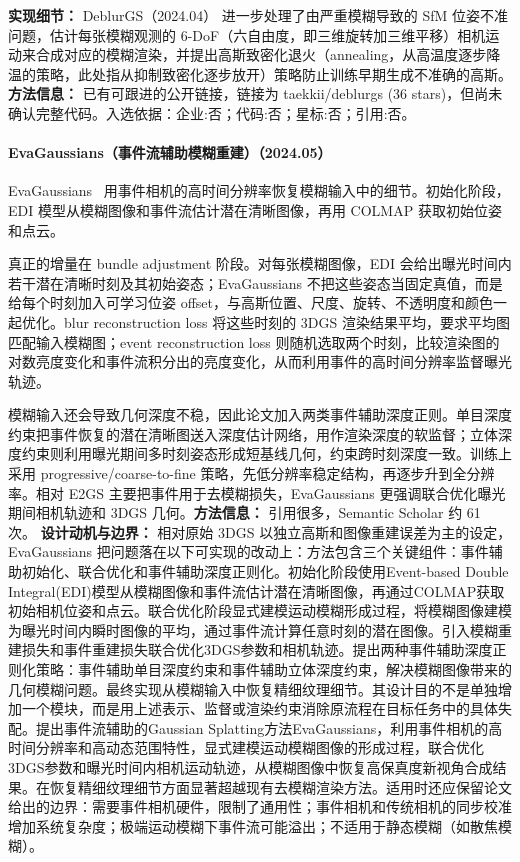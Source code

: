 \textbf{实现细节：} DeblurGS（2024.04） 进一步处理了由严重模糊导致的 SfM 位姿不准问题，估计每张模糊观测的 6-DoF（六自由度，即三维旋转加三维平移）相机运动来合成对应的模糊渲染，并提出高斯致密化退火（annealing，从高温度逐步降温的策略，此处指从抑制致密化逐步放开）策略防止训练早期生成不准确的高斯。
\textbf{方法信息：} 已有可跟进的公开链接，链接为 taekkii/deblurgs (36 stars)，但尚未确认完整代码。入选依据：企业:否；代码:否；星标:否；引用:否。


\paragraph{EvaGaussians（事件流辅助模糊重建）（2024.05）}
EvaGaussians~\cite{2405_20224} 用事件相机的高时间分辨率恢复模糊输入中的细节。初始化阶段，EDI 模型从模糊图像和事件流估计潜在清晰图像，再用 COLMAP 获取初始位姿和点云。

真正的增量在 bundle adjustment 阶段。对每张模糊图像，EDI 会给出曝光时间内若干潜在清晰时刻及其初始姿态；EvaGaussians 不把这些姿态当固定真值，而是给每个时刻加入可学习位姿 offset，与高斯位置、尺度、旋转、不透明度和颜色一起优化。blur reconstruction loss 将这些时刻的 3DGS 渲染结果平均，要求平均图匹配输入模糊图；event reconstruction loss 则随机选取两个时刻，比较渲染图的对数亮度变化和事件流积分出的亮度变化，从而利用事件的高时间分辨率监督曝光轨迹。

模糊输入还会导致几何深度不稳，因此论文加入两类事件辅助深度正则。单目深度约束把事件恢复的潜在清晰图送入深度估计网络，用作渲染深度的软监督；立体深度约束则利用曝光期间多时刻姿态形成短基线几何，约束跨时刻深度一致。训练上采用 progressive/coarse-to-fine 策略，先低分辨率稳定结构，再逐步升到全分辨率。相对 E2GS 主要把事件用于去模糊损失，EvaGaussians 更强调联合优化曝光期间相机轨迹和 3DGS 几何。\textbf{方法信息：} 引用很多，Semantic Scholar 约 61 次。
\textbf{设计动机与边界：} 相对原始 3DGS 以独立高斯和图像重建误差为主的设定，EvaGaussians 把问题落在以下可实现的改动上：方法包含三个关键组件：事件辅助初始化、联合优化和事件辅助深度正则化。初始化阶段使用Event-based Double Integral(EDI)模型从模糊图像和事件流估计潜在清晰图像，再通过COLMAP获取初始相机位姿和点云。联合优化阶段显式建模运动模糊形成过程，将模糊图像建模为曝光时间内瞬时图像的平均，通过事件流计算任意时刻的潜在图像。引入模糊重建损失和事件重建损失联合优化3DGS参数和相机轨迹。提出两种事件辅助深度正则化策略：事件辅助单目深度约束和事件辅助立体深度约束，解决模糊图像带来的几何模糊问题。最终实现从模糊输入中恢复精细纹理细节。其设计目的不是单独增加一个模块，而是用上述表示、监督或渲染约束消除原流程在目标任务中的具体失配。提出事件流辅助的Gaussian Splatting方法EvaGaussians，利用事件相机的高时间分辨率和高动态范围特性，显式建模运动模糊图像的形成过程，联合优化3DGS参数和曝光时间内相机运动轨迹，从模糊图像中恢复高保真度新视角合成结果。在恢复精细纹理细节方面显著超越现有去模糊渲染方法。适用时还应保留论文给出的边界：需要事件相机硬件，限制了通用性；事件相机和传统相机的同步校准增加系统复杂度；极端运动模糊下事件流可能溢出；不适用于静态模糊（如散焦模糊）。
